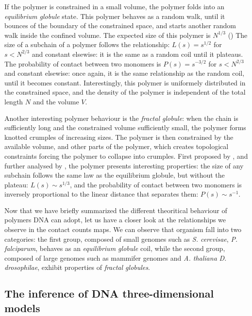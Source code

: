 If the polymer is constrained in a small volume, the polymer folds into an
\textit{equilibrium globule} state. This polymer behaves as a random walk,
until it bounces of the boundary of the constrained space, and starts another
random walk inside the confined volume. The expected size of this polymer is
$N^{1/3}$ () The size of a subchain of a polymer follows the relationship: $L(s) =
s^{1/2}$ for $s < N^{2/3}$ and constant elsewise: it is the same as a random
coil until it plateaus. The probability of contact between two monomers is
$P(s) = s^{-3/2}$ for $s < N^{2/3}$ and constant elsewise: once again, it is
the same relationship as the random coil, until it becomes constant.
Interestingly, this polymer is uniformely distributed in the constrained
space, and the density of the polymer is independent of the total length $N$
and the volume $V$.

Another interesting polymer behaviour is the \textit{fractal globule}: when
the chain is sufficiently long and the constrained volume sufficiently small,
the polymer forms knotted crumples of increasing sizes. The polymer is then
constrained by the available volume, and other parts of the polymer, which
creates topological constraints forcing the polymer to collapse into crumples.
First proposed by \citet{grosberg:role}, and further analysed by
\citet{mirny:fractal}, the polymer presents interesting properties: the size
of any subchain follows the same law as the equilibrium globule, but without
the plateau: $L(s) \sim s^{1/3}$, and the probability of contact between two
monomers is inversely proportional to the linear distance that separates them:
$P(s) \sim s^{-1}$.

Now that we have briefly summarized the different theoritical behaviour of
polymers DNA can adopt, let us have a closer look at the relationships we
observe in the contact counts maps. We can observe that organism fall into two
categories: the first group, composed of small genomes such as \textit{S.
cerevisae}, \textit{P. falciparum}, behaves as an \textit{equilibrium globule}
coil, while the second group, composed of large genomes such as mammifer
genomes and \textit{A. thaliana} \textit{D. drosophilae}, exhibit properties
of \textit{fractal globules}.

\subsection{The inference of DNA three-dimensional models}


